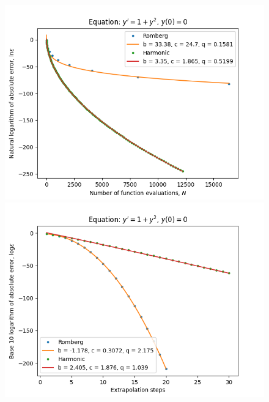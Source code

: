 \begin{figure}[H]
\centering
\begin{minipage}{0.45\textwidth}
\centering
\includegraphics[scale=0.45]{emr_plots/tangens_hp_trend.png}
\end{minipage}
\begin{minipage}{0.45\textwidth}
\centering
\includegraphics[scale=0.45]{emr_plots/tangens_hp_steps.png}
\end{minipage}
\end{figure}

